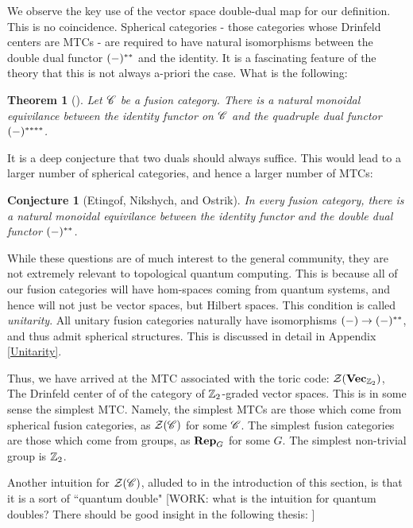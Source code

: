 \documentclass{article}
\newtheorem{theorem}{Theorem}[section]
\newtheorem{conjecture}{Conjecture}[section]
\theoremstyle{definition}
\numberwithin{figure}{section}
\begin{document}
We observe the key use of the vector space double-dual map for our definition. This is no coincidence. Spherical categories - those categories whose Drinfeld centers are MTCs - are required to have natural isomorphisms between the double dual functor $(\--)^{**}$ and the identity. It is a fascinating feature of the theory that this is not always a-priori the case. What is the following:

\begin{theorem}[\cite{etingof2005fusion}] Let $\mathscr{C}$ be a fusion category. There is a natural monoidal equivilance between the identity functor on $\mathscr{C}$ and the quadruple dual functor $(\--)^{****}$.
\end{theorem}

It is a deep conjecture that two duals should always suffice. This would lead to a larger number of spherical categories, and hence a larger number of MTCs:

\begin{conjecture}[Etingof, Nikshych, and Ostrik] In every fusion category, there is a natural monoidal equivilance between the identity functor and the double dual functor $(\--)^{**}$.
\end{conjecture}

While these questions are of much interest to the general community, they are not extremely relevant to topological quantum computing. This is because all of our fusion categories will have hom-spaces coming from quantum systems, and hence will not just be vector spaces, but Hilbert spaces. This condition is called \textit{unitarity}. All unitary fusion categories naturally have isomorphisms $(\--)\to (\--)^{**}$, and thus admit spherical structures. This is discussed in detail in Appendix \ref{Unitarity}.

Thus, we have arrived at the MTC associated with the toric code: $\mathcal{Z}(\bold{Vec}_{\mathbb{Z}_2})$, The Drinfeld center of of the category of $\mathbb{Z}_2$-graded vector spaces. This is in some sense the simplest MTC. Namely, the simplest MTCs are those which come from spherical fusion categories,  as $\mathcal{Z}(\mathscr{C})$ for some $\mathscr{C}$. The simplest fusion categories are those which come from groups, as $\bold{Rep}_G$ for some $G$. The simplest non-trivial group is $\mathbb{Z}_2$.

Another intuition for $\mathcal{Z}(\mathscr{C})$, alluded to in the introduction of this section, is that it is a sort of ``quantum double" [WORK: what is the intuition for quantum doubles? There should be good insight in the following thesis: \cite{felice2017hopf}]
\end{document}
